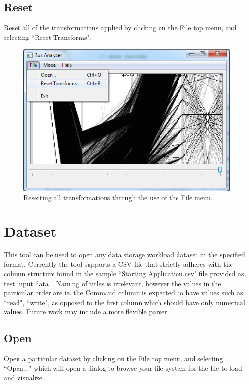 \documentclass[12pt]{ucthesis}
\begin{document}
\clearpage

\subsection{Reset}
Reset all of the transformations applied by clicking on the File top menu, and selecting ``Reset Transforms".

\begin{figure}[htb!]
 \centering
 \includegraphics[width=\textwidth]{images/documentation/reset.jpg}
 \caption[Resetting all transformations through the use of the File menu.]{Resetting all transformations through the use of the File menu.}
 \label{fig:doc}
\end{figure}

\section{Dataset}
This tool can be used to open any data storage workload dataset in the specified format. Currently the tool supports a CSV file that strictly adheres with the column structure found in the sample ``Starting Application.csv" file provided as test input data~\cite{steven:source}. Naming of titles is irrelevant, however the values in the particular order are ie. the Command column is expected to have values such as: ``read", ``write", as opposed to the first column which should have only numerical values. Future work may include a more flexible parser.

\subsection{Open}
Open a particular dataset by clicking on the File top menu, and selecting ``Open..." which will open a dialog to browse your file system for the file to load and visualize.
\end{document}
